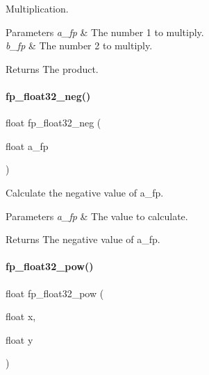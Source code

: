 Multiplication. 


\begin{DoxyParams}{Parameters}
{\em a\+\_\+fp} & The number 1 to multiply. \\
\hline
{\em b\+\_\+fp} & The number 2 to multiply. \\
\hline
\end{DoxyParams}
\begin{DoxyReturn}{Returns}
The product. 
\end{DoxyReturn}
\mbox{\label{a00023_a4702619cb8ca993b69919e1d7ca71f57}} 
\paragraph{\texorpdfstring{fp\+\_\+float32\+\_\+neg()}{fp\_float32\_neg()}}
{\footnotesize\ttfamily float fp\+\_\+float32\+\_\+neg (\begin{DoxyParamCaption}\item[{float}]{a\+\_\+fp }\end{DoxyParamCaption})}



Calculate the negative value of a\+\_\+fp. 


\begin{DoxyParams}{Parameters}
{\em a\+\_\+fp} & The value to calculate. \\
\hline
\end{DoxyParams}
\begin{DoxyReturn}{Returns}
The negative value of a\+\_\+fp. 
\end{DoxyReturn}
\mbox{\label{a00023_ac888f98a6e5d89837b647d2c81725836}} 
\paragraph{\texorpdfstring{fp\+\_\+float32\+\_\+pow()}{fp\_float32\_pow()}}
{\footnotesize\ttfamily float fp\+\_\+float32\+\_\+pow (\begin{DoxyParamCaption}\item[{float}]{x,  }\item[{float}]{y }\end{DoxyParamCaption})}




